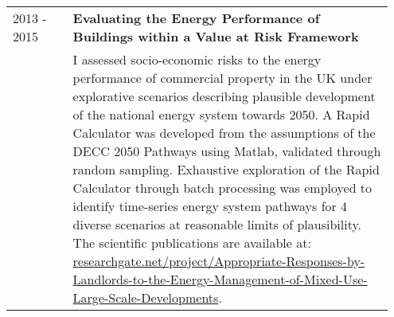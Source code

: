 \documentclass[11pt, oneside]{article}   	%
\begin{document}
\begin{table}[h]
\begin{center}
\begin{tabular}{p{0.15\linewidth} p{0.8\linewidth}}
2013 - 2015&\textbf{Evaluating the Energy Performance of Buildings within a Value at Risk Framework} \\
&I assessed socio-economic risks to the energy performance of commercial property in the UK under explorative scenarios describing plausible development of the national energy system towards 2050. A Rapid Calculator was developed from the assumptions of the DECC 2050 Pathways using Matlab, validated through random sampling. Exhaustive exploration of the Rapid Calculator through batch processing was employed to identify time-series energy system pathways for 4 diverse scenarios at reasonable limits of plausibility. The scientific publications are available at:
 \url{researchgate.net/project/Appropriate-Responses-by-Landlords-to-the-Energy-Management-of-Mixed-Use-Large-Scale-Developments}. \\
\hline
\end{tabular}
\end{center}
\vspace{-10mm}
\end{table}

\pagebreak
\end{document}
